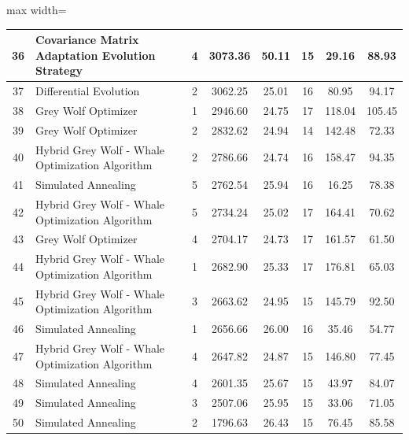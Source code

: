 \documentclass[Afour,sagev,times]{sagej}
\begin{document}
\begin{table}[htbp]
\begin{adjustbox}{max width=\textwidth}
\begin{tabular}{|c|l|c|c|c|c|c|c|}
36 & Covariance Matrix Adaptation Evolution Strategy & 4 & 3073.36 & 50.11 & 15 & 29.16 & 88.93 \\ \hline
37 & Differential Evolution & 2 & 3062.25 & 25.01 & 16 & 80.95 & 94.17 \\ \hline
38 & Grey Wolf Optimizer & 1 & 2946.60 & 24.75 & 17 & 118.04 & 105.45 \\ \hline
39 & Grey Wolf Optimizer & 2 & 2832.62 & 24.94 & 14 & 142.48 & 72.33 \\ \hline
40 & Hybrid Grey Wolf - Whale Optimization Algorithm & 2 & 2786.66 & 24.74 & 16 & 158.47 & 94.35 \\ \hline
41 & Simulated Annealing & 5 & 2762.54 & 25.94 & 16 & 16.25 & 78.38 \\ \hline
42 & Hybrid Grey Wolf - Whale Optimization Algorithm & 5 & 2734.24 & 25.02 & 17 & 164.41 & 70.62 \\ \hline
43 & Grey Wolf Optimizer & 4 & 2704.17 & 24.73 & 17 & 161.57 & 61.50 \\ \hline
44 & Hybrid Grey Wolf - Whale Optimization Algorithm & 1 & 2682.90 & 25.33 & 17 & 176.81 & 65.03 \\ \hline
45 & Hybrid Grey Wolf - Whale Optimization Algorithm & 3 & 2663.62 & 24.95 & 15 & 145.79 & 92.50 \\ \hline
46 & Simulated Annealing & 1 & 2656.66 & 26.00 & 16 & 35.46 & 54.77 \\ \hline
47 & Hybrid Grey Wolf - Whale Optimization Algorithm & 4 & 2647.82 & 24.87 & 15 & 146.80 & 77.45 \\ \hline
48 & Simulated Annealing & 4 & 2601.35 & 25.67 & 15 & 43.97 & 84.07 \\ \hline
49 & Simulated Annealing & 3 & 2507.06 & 25.95 & 15 & 33.06 & 71.05 \\ \hline
50 & Simulated Annealing & 2 & 1796.63 & 26.43 & 15 & 76.45 & 85.58 \\ \hline
\end{tabular}
\end{adjustbox}
\label{tab:execution_data}
\end{table}
\end{document}
